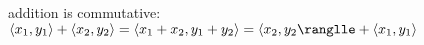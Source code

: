 \documentclass[preview]{standalone}
\begin{document}
\begin{center}
addition is commutative: $\langle x_1, y_1 \rangle + \langle x_2, y_2 \rangle = \langle x_1 + x_2, y_1 + y_2 \rangle = \langle x_2, y_2 \ranglle + \langle x_1, y_1 \rangle $
\end{center}
\end{document}
